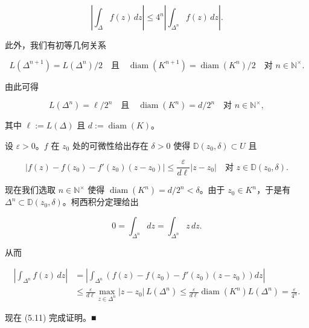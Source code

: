 \begin{theorem}
\begin{subitems}
\begin{equation}
\left|\int_{\Delta} f(z)\,dz\right| \le 4^{n}\left|\int_{\Delta^{n}}f(z)\,dz\right| .\tag{5.11}
\end{equation}

此外，我们有初等几何关系

\[
L(\Delta^{n+1}) = L(\Delta^{n})/2 \quad \text{且} \quad \operatorname{diam}(K^{n+1}) = \operatorname{diam}(K^{n})/2 \quad \text{对 } n \in \mathbb{N}^{\times} .
\]

由此可得

\[
L(\Delta^{n}) = \ell/2^{n} \quad \text{且} \quad \operatorname{diam}(K^{n}) = d/2^{n} \quad \text{对 } n \in \mathbb{N}^{\times} ,
\]

其中 $ \ell := L(\Delta) $ 且 $ d := \operatorname{diam}(K) $。

\item[（iv）]

设 $ \varepsilon > 0 $。$ f $ 在 $ z_{0} $ 处的可微性给出存在 $ \delta > 0 $ 使得 $ \mathbb{D}(z_{0},\delta) \subset U $ 且

\[
\left|f(z) - f(z_{0}) - f'(z_{0})(z - z_{0})\right| \le \frac{\varepsilon}{d\ell}|z - z_{0}| \quad \text{对 } z \in \mathbb{D}(z_{0},\delta) .
\]

现在我们选取 $ n \in \mathbb{N}^{\times} $ 使得 $ \operatorname{diam}(K^{n}) = d/2^{n} < \delta $。由于 $ z_{0} \in K^{n} $，于是有 $ \Delta^{n} \subset \mathbb{D}(z_{0},\delta) $。柯西积分定理给出

\[
0 = \int_{\Delta^{n}}dz = \int_{\Delta^{n}}z\,dz .
\]

从而

\begin{equation*}
\begin{aligned}
\left|\int_{\Delta^{n}}f(z)\,dz\right| &= \left|\int_{\Delta^{n}}\left(f(z) - f(z_{0}) - f'(z_{0})(z - z_{0})\right)dz\right| \\ &\le \frac{\varepsilon}{d\ell}\max_{z\in\Delta^{n}}|z - z_{0}|\,L(\Delta^{n}) \le \frac{\varepsilon}{d\ell}\operatorname{diam}(K^{n})L(\Delta^{n}) = \frac{\varepsilon}{4^{n}} .
\end{aligned}
\end{equation*}

现在 (5.11) 完成证明。\nobreak\hspace{0.35em}■

\end{subitems}

\end{theorem}

